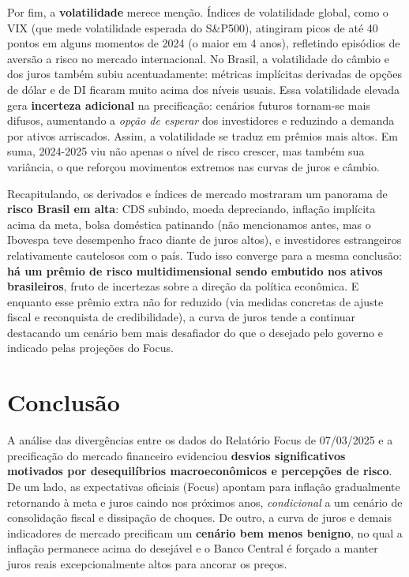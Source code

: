\documentclass[a4paper,12pt]{article}
\begin{document}
Por fim, a \textbf{volatilidade} merece menção. Índices de volatilidade global, como o VIX (que mede volatilidade esperada do S\&P500), atingiram picos de até 40 pontos em alguns momentos de 2024 (o maior em 4 anos), refletindo episódios de aversão a risco no mercado internacional. No Brasil, a volatilidade do câmbio e dos juros também subiu acentuadamente: métricas implícitas derivadas de opções de dólar e de DI ficaram muito acima dos níveis usuais. Essa volatilidade elevada gera \textbf{incerteza adicional} na precificação: cenários futuros tornam-se mais difusos, aumentando a \textit{opção de esperar} dos investidores e reduzindo a demanda por ativos arriscados. Assim, a volatilidade se traduz em prêmios mais altos. Em suma, 2024-2025 viu não apenas o nível de risco crescer, mas também sua variância, o que reforçou movimentos extremos nas curvas de juros e câmbio. 

Recapitulando, os derivados e índices de mercado mostraram um panorama de \textbf{risco Brasil em alta}: CDS subindo, moeda depreciando, inflação implícita acima da meta, bolsa doméstica patinando (não mencionamos antes, mas o Ibovespa teve desempenho fraco diante de juros altos), e investidores estrangeiros relativamente cautelosos com o país. Tudo isso converge para a mesma conclusão: \textbf{há um prêmio de risco multidimensional sendo embutido nos ativos brasileiros}, fruto de incertezas sobre a direção da política econômica. E enquanto esse prêmio extra não for reduzido (via medidas concretas de ajuste fiscal e reconquista de credibilidade), a curva de juros tende a continuar destacando um cenário bem mais desafiador do que o desejado pelo governo e indicado pelas projeções do Focus.

\section*{Conclusão}

A análise das divergências entre os dados do Relatório Focus de 07/03/2025 e a precificação do mercado financeiro evidenciou \textbf{desvios significativos motivados por desequilíbrios macroeconômicos e percepções de risco}. De um lado, as expectativas oficiais (Focus) apontam para inflação gradualmente retornando à meta e juros caindo nos próximos anos, \textit{condicional} a um cenário de consolidação fiscal e dissipação de choques. De outro, a curva de juros e demais indicadores de mercado precificam um \textbf{cenário bem menos benigno}, no qual a inflação permanece acima do desejável e o Banco Central é forçado a manter juros reais excepcionalmente altos para ancorar os preços.
\end{document}
